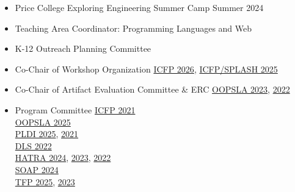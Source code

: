 \documentclass[11pt]{article}
\begin{document}

\begin{itemize}
  \item Price College Exploring Engineering Summer Camp \hfill Summer 2024
  \item {Teaching Area Coordinator: Programming Languages and Web} \hfill {}
  \item {K-12 Outreach Planning Committee} \hfill {}
\end{itemize}



\begin{itemize}
  \item {Co-Chair of Workshop Organization} \hfill \href{}{ICFP 2026}, \href{https://conf.researchr.org/committee/icfp-splash-2025/icfp-splash-2025-organizing-committee}{ICFP/SPLASH 2025}
  \item {Co-Chair of Artifact Evaluation Committee \& ERC} \hfill \href{https://2023.splashcon.org}{OOPSLA 2023}, \href{https://2022.splashcon.org}{2022}
  \item {Program Committee}
          \hfill \href{https://icfp21.sigplan.org/committee/icfp-2021-papers-program-committee}{ICFP 2021} \\
   \hbox{}\hfill \href{https://2025.splashcon.org/committee/splash-2025-OOPSLA-oopsla-review-committee}{OOPSLA 2025} \\
   \hbox{}\hfill \href{https://pldi25.sigplan.org/committee/pldi-2025-papers-pldi-review-committee}{PLDI 2025}, \href{https://pldi21.sigplan.org/committee/pldi-2021-papers-program-committee}{2021} \\
   \hbox{}\hfill \href{https://2022.splashcon.org/track/dls-2022-papers}{DLS 2022} \\
   \hbox{}\hfill \href{https://2024.splashcon.org/home/hatra-2024}{HATRA 2024}, \href{https://2023.splashcon.org/home/hatra-2023}{2023}, \href{https://2022.splashcon.org/home/hatra-2022}{2022} \\
   \hbox{}\hfill \href{https://pldi24.sigplan.org/home/SOAP-2024}{SOAP 2024} \\
   \hbox{}\hfill \href{https://trendsfp.github.io/}{TFP 2025}, \href{https://trendsfp.github.io/2023/}{2023}


\end{itemize}
\end{document}
